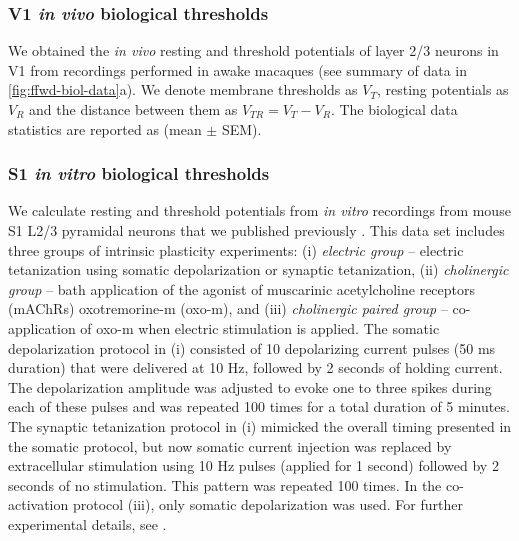 \subsubsection*{V1 \textit{in vivo} biological thresholds}

We obtained the \textit{in vivo} resting and threshold potentials
        of layer 2/3 neurons in V1 from recordings performed in awake macaques \citep{Li2020-ej}
        (see summary of data in \autoref{fig:ffwd-biol-data}a).
    We denote membrane thresholds as $V_T$,
        resting potentials as $V_R$
        and the distance between them as $V_{TR} = V_T - V_R$.
    The biological data statistics are reported as (mean $\pm$ SEM).

\subsubsection*{S1 \textit{in vitro} biological thresholds}

We calculate resting and threshold potentials from \textit{in vitro} recordings
        from mouse S1 L2/3 pyramidal neurons that we published previously \citep{Gill2020-wy}.
    This data set includes three groups of intrinsic plasticity experiments:
        (i) \textit{electric group} -- electric tetanization using somatic depolarization or synaptic tetanization,
        (ii) \textit{cholinergic group} -- bath application of the agonist of muscarinic acetylcholine receptors (mAChRs) oxotremorine-m (oxo-m),
        and (iii) \textit{cholinergic paired group} -- co-application of oxo-m when electric stimulation is applied.
    The somatic depolarization protocol in (i) consisted of
        10 depolarizing current pulses (50 ms duration) that
        were delivered at 10 Hz, followed by 2 seconds of holding current.
    The depolarization amplitude was adjusted to evoke one to three spikes during each of these pulses
        and was repeated 100 times for a total duration of 5 minutes.
    The synaptic tetanization protocol in (i) mimicked the overall timing presented in the somatic protocol,
        but now somatic current injection was replaced by
            extracellular stimulation using 10 Hz pulses (applied for 1 second)
            followed by 2 seconds of no stimulation.
    This pattern was repeated 100 times.
    In the co-activation protocol (iii), only somatic depolarization was used.
    For further experimental details, see \cite{Gill2020-wy}.


